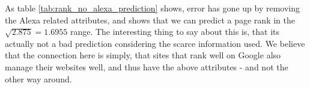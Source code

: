 As table \ref{tab:rank_no_alexa_prediction} shows, error has gone up by removing the Alexa related attributes, and shows that we can predict a page rank in the \(\sqrt{2.875} = 1.6955\) range. The interesting thing to say about this is, that its actually not a bad prediction considering the scarce information used. We believe that the connection here is simply, that sites that rank well on Google also manage their websites well, and thus have the above attributes - and not the other way around.

